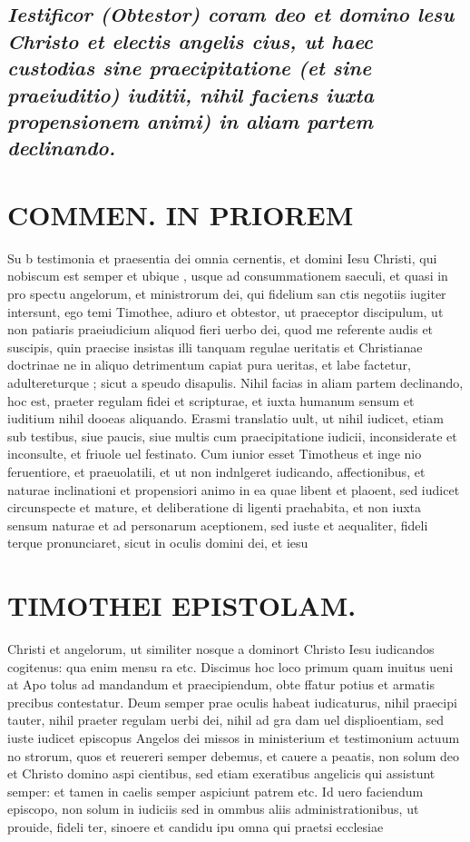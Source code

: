 \documentclass{article}
\begin{document}
\begin{pages}
\subsection*{\textit{Iestificor (Obtestor) coram deo et domino lesu Christo et electis angelis cius, ut haec custodias sine praecipitatione (et sine praeiuditio) iuditii, nihil faciens iuxta propensionem animi) in aliam partem declinando. }}
\section*{COMMEN. IN PRIOREM }
\marginpar{[ p.146 ]}\pstart Su b testimonia et praesentia dei omnia cernentis, et domini Iesu Christi, qui nobiscum est semper et ubique , usque ad consummationem saeculi, et quasi in pro spectu angelorum, et ministrorum dei, qui fidelium san ctis negotiis iugiter intersunt, ego temi Timothee, adiuro et obtestor, ut praeceptor discipulum, ut non patiaris praeiudicium aliquod fieri uerbo dei, quod me referente audis et suscipis, quin praecise insistas illi tanquam regulae ueritatis et Christianae doctrinae ne in aliquo detrimentum capiat pura ueritas, et labe factetur, adultereturque ; sicut a speudo disapulis. Nihil facias in aliam partem declinando, hoc est, praeter regulam fidei et scripturae, et iuxta humanum sensum et iuditium nihil dooeas aliquando.  \pend\pstart Erasmi translatio uult, ut nihil iudicet, etiam sub testibus, siue paucis, siue multis cum praecipitatione iudicii, inconsiderate et inconsulte, et friuole uel festinato. Cum iunior esset Timotheus et inge nio feruentiore, et praeuolatili, et ut non indnlgeret iudicando, affectionibus, et naturae inclinationi et propensiori animo in ea quae libent et plaoent, sed iudicet circunspecte et mature, et deliberatione di ligenti praehabita, et non iuxta sensum naturae et ad personarum aceptionem, sed iuste et aequaliter, fideli terque pronunciaret, sicut in oculis domini dei, et iesu  \pend
\section*{TIMOTHEI EPISTOLAM. }
\marginpar{[ p.147 ]}\pstart Christi et angelorum, ut similiter nosque a dominort Christo Iesu iudicandos cogitenus: qua enim mensu ra etc. Discimus hoc loco primum quam inuitus ueni at Apo tolus ad mandandum et praecipiendum, obte ffatur potius et armatis precibus contestatur. Deum semper prae oculis habeat iudicaturus, nihil praecipi tauter, nihil praeter regulam uerbi dei, nihil ad gra dam uel displioentiam, sed iuste iudicet episcopus Angelos dei missos in ministerium et testimonium actuum no strorum, quos et reuereri semper debemus, et cauere a peaatis, non solum deo et Christo domino aspi cientibus, sed etiam exeratibus angelicis qui assistunt semper: et tamen in caelis semper aspiciunt patrem etc. Id uero faciendum episcopo, non solum in iudiciis sed in ommbus aliis administrationibus, ut prouide, fideli ter, sinoere et candidu ipu omna qui praetsi ecclesiae  \pend
{}
{}

\end{pages}
\end{document}
